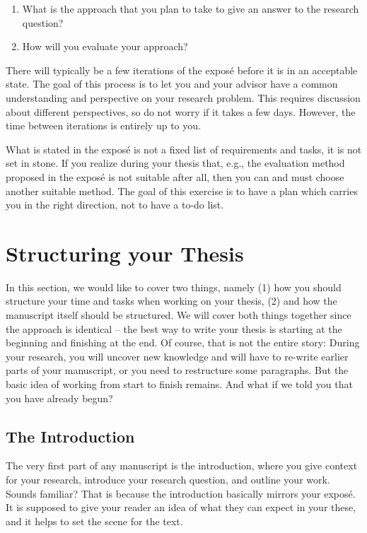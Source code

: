 \documentclass[a4]{article}
\begin{document}
\begin{enumerate}
    \item What is the approach that you plan to take to give an answer to the research question?
    \item How will you evaluate your approach?
\end{enumerate}

There will typically be a few iterations of the expos\'e before it is in an acceptable state.
The goal of this process is to let you and your advisor have a common understanding and perspective on your research problem.
This requires discussion about different perspectives, so do not worry if it takes a few days.
However, the time between iterations is entirely up to you.

What is stated in the expos\'e is not a fixed list of requirements and tasks, it is not set in stone.
If you realize during your thesis that, e.g., the evaluation method proposed in the expos\'e is not suitable after all, then you can and must choose another suitable method.
The goal of this exercise is to have a plan which carries you in the right direction, not to have a to-do list.

\section{Structuring your Thesis}
\label{sec:structure}

In this section, we would like to cover two things, namely (1) how you should structure your time and tasks when working on your thesis, (2) and how the manuscript itself should be structured.
We will cover both things together since the approach is identical -- the best way to write your thesis is starting at the beginning and finishing at the end.
Of course, that is not the entire story: During your research, you will uncover new knowledge and will have to re-write earlier parts of your manuscript, or you need to restructure some paragraphs.
But the basic idea of working from start to finish remains.
And what if we told you that you have already begun?

\subsection{The Introduction}

The very first part of any manuscript is the introduction, where you give context for your research, introduce your research question, and outline your work.
Sounds familiar?
That is because the introduction basically mirrors your expos\'e.
It is supposed to give your reader an idea of what they can expect in your these, and it helps to set the scene for the text.
\end{document}
